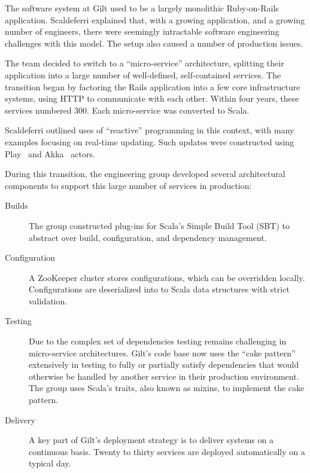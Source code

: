 \documentclass{jfp1}
\begin{document}
The software system at Gilt used to be a largely monolithic Ruby-on-Rails
application.  Scaldeferri explained that, with a growing application, and
a growing number of engineers, there were seemingly intractable software
engineering challenges with this model. The setup also caused a number of
production issues.

The team decided to switch to a ``micro-service'' architecture, splitting
their application into a large number of well-defined, self-contained
services. The transition began by factoring the Rails application into a
few core infrastructure systems, using HTTP to communicate with each
other. Within four years, these services numbered 300. Each micro-service
was converted to Scala. 

Scaldeferri outlined uses of ``reactive'' programming in this context,
with many examples focusing on real-time updating.  Such updates were
constructed using Play~\cite{Typesafe:2014:Play} and
Akka~\cite{Typesafe:2014:Akka} actors.

During this transition, the engineering group developed several
architectural components to support this large number of services in
production:
\begin{description}
\item[Builds] The group constructed plug-ins for Scala's Simple Build
Tool (SBT) to abstract over build, configuration, and dependency
management.

\item[Configuration] A ZooKeeper cluster stores configurations, which can
be overridden locally. Configurations are deserialized into to Scala data
structures with strict validation.

\item[Testing] Due to the complex set of dependencies testing remains
challenging in micro-service architectures.  Gilt's code base now uses the
``cake pattern'' extensively in testing to fully or partially satisfy
dependencies that would otherwise be handled by another service in their
production environment. The group uses Scala's traits, also known as
mixins, to implement the cake pattern.
 
\item[Delivery] A key part of Gilt's deployment strategy is to deliver
systems on a continuous basis. Twenty to thirty services are deployed
automatically on a typical day.
\end{description}

\end{document}
